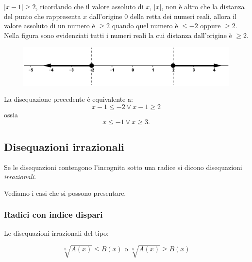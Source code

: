 \begin{esempio} $|x-1|\geq 2$, ricordando che il valore 
assoluto di $x$, $|x|$, non è altro che la distanza del punto che rappresenta 
$x$ dall'origine 0 della retta dei numeri reali, allora il valore assoluto di 
un numero è $\geq 2$ quando quel numero è $\leq -2$ oppure $\geq 2$.\\
        Nella figura sono evidenziati tutti i numeri reali la cui distanza 
dall'origine è $\geq 2$.

\begin{figure}[h]
\begin{inaccessibleblock}[TODO]
\centering
\includegraphics[width=0.9\linewidth]{img/imm5} %
\end{inaccessibleblock}
\label{fig:abs_imm5}
\end{figure}

        La disequazione precedente è equivalente a:
        $$x-1\leq -2 \vee x-1 \geq 2$$
        ossia
        $$x\leq -1 \vee x\geq 3.$$
\end{esempio}

\subsection{Disequazioni irrazionali}

Se le disequazioni contengono l'incognita sotto una radice si dicono 
disequazioni \emph{irrazionali}.

Vediamo i casi che si possono presentare.

\subsubsection{Radici con indice dispari}

Le disequazioni irrazionali del tipo:

\[\sqrt[n]{A(x)} \leqslant B(x) \text{ o } \sqrt[n]{A(x)} \geqslant B(x)\]

